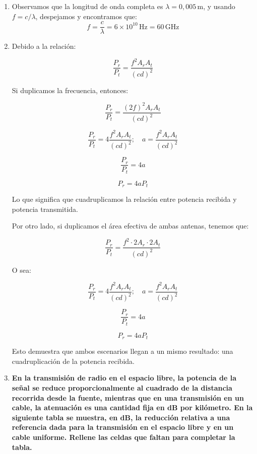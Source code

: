 \documentclass[11pt,a4paper]{article}
\begin{document}
\begin{enumerate}[label=4.\arabic*), itemsep=0.3cm]
  \item
        Observamos que la longitud de onda completa es $\lambda = 0,005\,\mathrm{m}$, y usando $f = c/\lambda$, despejamos y encontramos que:
        \[
          f = \frac{c}{\lambda} = 6\times10^{10}\,\mathrm{Hz} = 60\,\mathrm{GHz}
        \]
  \item

        Debido a la relación:

        \[
          \frac{P_r}{P_t} = \frac{f^2 A_r A_t}{(cd)^2}
        \]

        Si duplicamos la frecuencia, entonces:

        \[
          \frac{P_r}{P_t} = \frac{(2f)^2 A_r A_t}{(cd)^2}
        \]

        \[
          \frac{P_r}{P_t} = 4 \frac{f^2 A_r A_t}{(cd)^2}; \quad a = \frac{f^2 A_r A_t}{(cd)^2}
        \]

        \[
          \frac{P_r}{P_t} = 4a
        \]

        \[
          P_r = 4a P_t
        \]

        Lo que significa que cuadruplicamos la relación entre potencia recibida y potencia transmitida.

        Por otro lado, si duplicamos el área efectiva de ambas antenas, tenemos que:

        \[
          \frac{P_r}{P_t} = \frac{f^2 \cdot 2A_r \cdot 2A_t}{(cd)^2}
        \]

        O sea:

        \[
          \frac{P_r}{P_t} = 4 \frac{f^2 A_r A_t}{(cd)^2}; \quad a = \frac{f^2 A_r A_t}{(cd)^2}
        \]

        \[
          \frac{P_r}{P_t} = 4a
        \]

        \[
          P_r = 4a P_t
        \]

        Esto demuestra que ambos escenarios llegan a un mismo resultado: una cuadruplicación de la potencia recibida.

  \item \textbf{En la transmisión de radio en el espacio libre, la potencia de la señal se reduce proporcionalmente al cuadrado de la distancia recorrida desde la fuente, mientras que en una transmisión en un cable, la atenuación es una cantidad fija en dB por kilómetro. En la siguiente
          tabla se muestra, en dB, la reducción relativa a una referencia dada para la transmisión en
          el espacio libre y en un cable uniforme. Rellene las celdas que faltan para completar la
          tabla.}


\end{enumerate}
\end{document}
